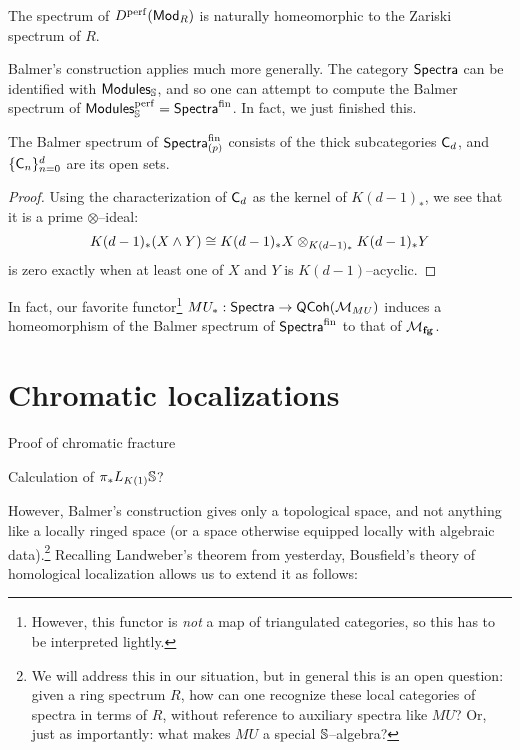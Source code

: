 \begin{theorem}[Balmer]
The spectrum of $D^{\perf}(\CatOf{Mod}_R)$ is naturally homeomorphic to the Zariski spectrum of $R$.
\end{theorem}

Balmer's construction applies much more generally.  The category $\CatOf{Spectra}$ can be identified with $\CatOf{Modules}_{\S}$, and so one can attempt to compute the Balmer spectrum of $\CatOf{Modules}_{\S}^{\perf} = \CatOf{Spectra}^{\mathrm{fin}}$.  In fact, we just finished this.
\begin{theorem}
The Balmer spectrum of $\CatOf{Spectra}_{(p)}^{\mathrm{fin}}$ consists of the thick subcategories $\CatOf C_d$, and $\{\CatOf C_n\}_{n=0}^d$ are its open sets.
\end{theorem}
\begin{proof}
Using the characterization of $\CatOf C_d$ as the kernel of $K(d-1)_*$, we see that it is a prime $\otimes$--ideal: \[K(d-1)_*(X \sm Y) \cong K(d-1)_* X \otimes_{K(d-1)_*} K(d-1)_* Y\] is zero exactly when at least one of $X$ and $Y$ is $K(d-1)$--acyclic.
\end{proof}

In fact, our favorite functor\footnote{However, this functor is \emph{not} a map of triangulated categories, so this has to be interpreted lightly.} $MU_*: \CatOf{Spectra} \to \CatOf{QCoh}(\context{MU})$ induces a homeomorphism of the Balmer spectrum of $\CatOf{Spectra}^{\mathrm{fin}}$ to that of $\moduli{fg}$.








\section{Chromatic localizations}

Proof of chromatic fracture

Calculation of $\pi_* L_{K(1)} \S$?


However, Balmer's construction gives only a topological space, and not anything like a locally ringed space (or a space otherwise equipped locally with algebraic data).\footnote{We will address this in our situation, but in general this is an open question: given a ring spectrum $R$, how can one recognize these local categories of spectra in terms of $R$, without reference to auxiliary spectra like $MU$?  Or, just as importantly: what makes $MU$ a special $\S$--algebra?}  Recalling Landweber's theorem from yesterday, Bousfield's theory of homological localization allows us to extend it as follows:

